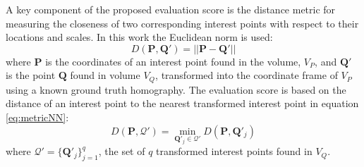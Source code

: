 A key component of the proposed evaluation score is the distance metric for measuring the closeness of two corresponding interest points with respect to their locations and scales. In this work the Euclidean norm is used:
\begin{equation}
D(\mathbf{P}, \mathbf{Q}') = ||\mathbf{P} - \mathbf{Q}'||
\label{eq:matchdistance}
\end{equation}
where $\mathbf{P}$ is the coordinates of an interest point found in the volume, $V_P$, and $\mathbf{Q}'$ is the point $\mathbf{Q}$ found in volume $V_Q$, transformed into the coordinate frame of $V_P$ using a known ground truth homography. The evaluation score is based on the distance of an interest point to the nearest transformed interest point in equation \ref{eq:metricNN}:
\begin{equation}
D(\mathbf{P}, \mathcal{Q}') = \min_{\mathbf{Q}'_j \in \mathcal{Q}'}D(\mathbf{P}, \mathbf{Q}'_j)
\label{eq:metricNN}
\end{equation}
where $\mathcal{Q}' = \{\mathbf{Q}'_j\}_{j=1}^{q}$, the set of $q$ transformed interest points found in $V_Q$.

